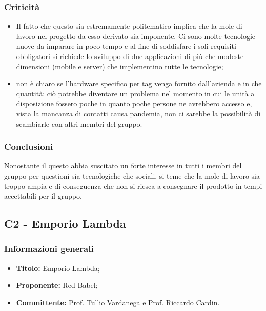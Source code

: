 \documentclass[]{article}
\begin{document}
			\subsubsection{Criticità}
			\begin{itemize}
				\item Il fatto che questo  sia estremamente politematico implica che la mole di lavoro nel progetto da esso derivato sia imponente. Ci sono molte tecnologie nuove da imparare in poco tempo e al fine di soddisfare i soli requisiti obbligatori si richiede lo sviluppo di due applicazioni di più che modeste dimensioni (mobile e server) che implementino tutte le tecnologie;
				\item non è chiaro se l'hardware specifico per tag  venga fornito dall'azienda e in che quantità; ciò potrebbe diventare un problema nel momento in cui le unità a disposizione fossero poche in quanto poche persone ne avrebbero accesso e, vista la mancanza di contatti causa pandemia, non ci sarebbe la possibilità di scambiarle con altri membri del gruppo.
			\end{itemize}

			\subsubsection{Conclusioni}
			Nonostante il questo  abbia suscitato un forte interesse in tutti i membri del gruppo per questioni sia tecnologiche che sociali, si teme che la mole di lavoro sia troppo ampia e di conseguenza che non si riesca a consegnare il prodotto in tempi accettabili per il gruppo.

		\newpage

		\subsection{C2 - Emporio Lambda}

		\subsubsection{Informazioni generali}
			\begin{itemize}
				\item \textbf{Titolo:} Emporio Lambda;
				\item \textbf{Proponente:} Red Babel;
				\item \textbf{Committente:} Prof. Tullio Vardanega e Prof. Riccardo Cardin.
			\end{itemize}
\end{document}
